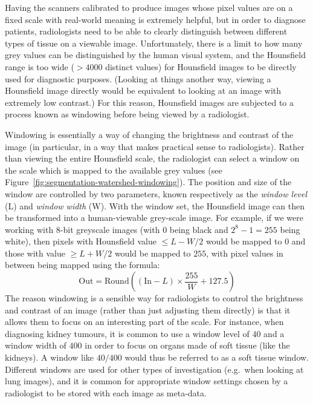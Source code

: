 Having the scanners calibrated to produce images whose pixel values are on a fixed scale with real-world meaning is extremely helpful, but in order to diagnose patients, radiologists need to be able to clearly distinguish between different types of tissue on a viewable image. Unfortunately, there is a limit to how many grey values can be distinguished by the human visual system, and the Hounsfield range is too wide ($> 4000$ distinct values) for Hounsfield images to be directly used for diagnostic purposes. (Looking at things another way, viewing a Hounsfield image directly would be equivalent to looking at an image with extremely low contrast.) For this reason, Hounsfield images are subjected to a process known as windowing before being viewed by a radiologist.

Windowing is essentially a way of changing the brightness and contrast of the image (in particular, in a way that makes practical sense to radiologists). Rather than viewing the entire Hounsfield scale, the radiologist can select a window on the scale which is mapped to the available grey values (see Figure~\ref{fig:segmentation-watershed-windowing}). The position and size of the window are controlled by two parameters, known respectively as the \emph{window level} (L) and \emph{window width} (W). With the window set, the Hounsfield image can then be transformed into a human-viewable grey-scale image. For example, if we were working with 8-bit greyscale images (with $0$ being black and $2^8 - 1 = 255$ being white), then pixels with Hounsfield value $\le L - W/2$ would be mapped to $0$ and those with value $\ge L + W/2$ would be mapped to $255$, with pixel values in between being mapped using the formula:
%
\[
\mbox{Out} = \mbox{Round}\left( (\mbox{In} - L) \times \frac{255}{W} + 127.5 \right)
\]
%
The reason windowing is a sensible way for radiologists to control the brightness and contrast of an image (rather than just adjusting them directly) is that it allows them to focus on an interesting part of the scale. For instance, when diagnosing kidney tumours, it is common to use a window level of $40$ and a window width of $400$ in order to focus on organs made of soft tissue (like the kidneys). A window like $40/400$ would thus be referred to as a soft tissue window. Different windows are used for other types of investigation (e.g.~when looking at lung images), and it is common for appropriate window settings chosen by a radiologist to be stored with each image as meta-data.

